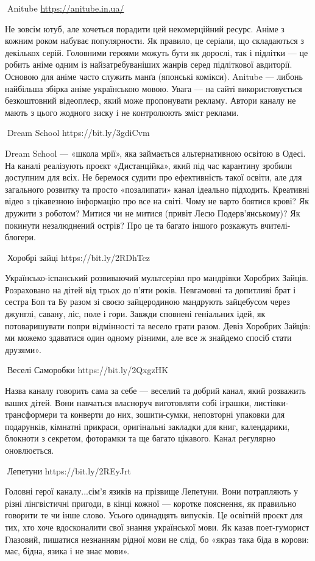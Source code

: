 🦉Anitube \url{https://anitube.in.ua/}

Не зовсім ютуб, але хочеться порадити цей некомерційний ресурс. Аніме з кожним
роком набуває популярности. Як правило, це серіали, що складаються з декількох
серій. Головними героями можуть бути як дорослі, так і підлітки — це робить
аніме одним із найзатребуваніших жанрів серед підліткової авдиторії. Основою
для аніме часто служить манґа (японські комікси). Anitube — либонь найбільша
збірка аніме українською мовою. Увага — на сайті використовується безкоштовний
відеоплеєр, який може пропонувати рекламу. Автори каналу не мають з цього
жодного зиску і не контролюють зміст реклами.

🦉Dream School https://bit.ly/3gdiCvm

Dream School — «школа мрії», яка займається альтернативною освітою в Одесі. На каналі реалізують проєкт «Дистанційка», який під час карантину зробили доступним для всіх. Не беремося судити про ефективність такої освіти, але для загального розвитку та просто «позалипати» канал ідеально підходить. Креативні відео з цікавезною інформацію про все на світі. Чому не варто боятися крові? Як дружити з роботом? Митися чи не митися (привіт Лесю Подерв’янському)? Як покинути незалюднений острів? Про це та багато іншого розкажуть вчителі-блогери.

🦉Хоробрі зайці https://bit.ly/2RDhTcz 

Українсько-іспанський розвиваючий мультсеріял про мандрівки Хоробрих Зайців. Розраховано на дітей від трьох до п’яти років. Невгамовні та допитливі брат і сестра Боп та Бу разом зі своєю зайцеродиною мандрують зайцебусом через джунглі, савану, ліс, поле і гори. Завжди сповнені геніальних ідей, як потоваришувати попри відмінності та весело грати разом. Девіз Хоробрих Зайців: ми можемо здаватися один одному різними, але все ж знайдемо спосіб стати друзями».

🦉Веселі Саморобки https://bit.ly/2QxgzHK 

Назва каналу говорить сама за себе — веселий та добрий канал, який розважить ваших дітей. Вони навчаться власноруч виготовляти собі іграшки, листівки-трансформери та конверти до них, зошити-сумки, неповторні упаковки для подарунків, кімнатні прикраси, оригінальні закладки для книг, календарики, блокноти з секретом, фоторамки та ще багато цікавого. Канал регулярно оновлюється.

🦉Лепетуни https://bit.ly/2REyJrt

Головні герої каналу...сім’я язиків на прізвище Лепетуни. Вони потрапляють у різні лінгвістичні пригоди, в кінці кожної — коротке пояснення, як правильно говорити те чи інше слово. Усього одинадцять випусків. Це освітній проєкт для тих, хто хоче вдосконалити свої знання української мови. Як казав поет-гуморист Глазовий, пишатися незнанням рідної мови не слід, бо «якраз така біда в корови: має, бідна, язика і не знає мови».

